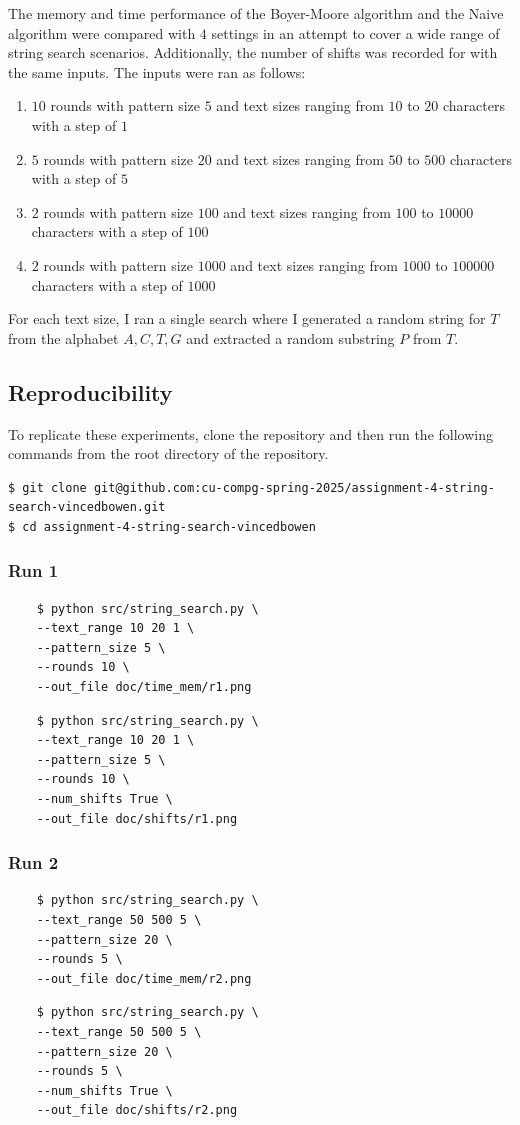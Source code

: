 \documentclass[11pt, letterpaper]{article}
\begin{document}
The memory and time performance of the Boyer-Moore algorithm and the Naive algorithm were compared with $4$ settings in an attempt to cover a wide range of string search scenarios. Additionally, the number of shifts was recorded for with the same inputs. The inputs were ran as follows:
\begin{enumerate}
    \item $10$ rounds with pattern size $5$ and text sizes ranging from $10$ to $20$ characters with a step of $1$
    \item $5$ rounds with pattern size $20$ and text sizes ranging from $50$ to $500$ characters with a step of $5$
    \item $2$ rounds with pattern size $100$ and text sizes ranging from $100$ to $10000$ characters with a step of $100$
    \item $2$ rounds with pattern size $1000$ and text sizes ranging from $1000$ to $100000$ characters with a step of $1000$
\end{enumerate}
For each text size, I ran a single search where I generated a random
string for $T$ from the alphabet ${A, C, T, G}$ and extracted a random
substring $P$ from $T$. 

\subsection{Reproducibility}
To replicate these experiments, clone the repository and then run the
following commands from the root directory of the repository.
\begin{verbatim}
$ git clone git@github.com:cu-compg-spring-2025/assignment-4-string-search-vincedbowen.git
$ cd assignment-4-string-search-vincedbowen
\end{verbatim}
\subsubsection{Run 1}
\begin{verbatim}
    $ python src/string_search.py \
    --text_range 10 20 1 \
    --pattern_size 5 \
    --rounds 10 \
    --out_file doc/time_mem/r1.png
\end{verbatim}
\begin{verbatim}
    $ python src/string_search.py \
    --text_range 10 20 1 \
    --pattern_size 5 \
    --rounds 10 \
    --num_shifts True \
    --out_file doc/shifts/r1.png
\end{verbatim}

\subsubsection{Run 2}
\begin{verbatim}
    $ python src/string_search.py \
    --text_range 50 500 5 \
    --pattern_size 20 \
    --rounds 5 \
    --out_file doc/time_mem/r2.png
\end{verbatim}
\begin{verbatim}
    $ python src/string_search.py \
    --text_range 50 500 5 \
    --pattern_size 20 \
    --rounds 5 \
    --num_shifts True \
    --out_file doc/shifts/r2.png
\end{verbatim}
\end{document}
